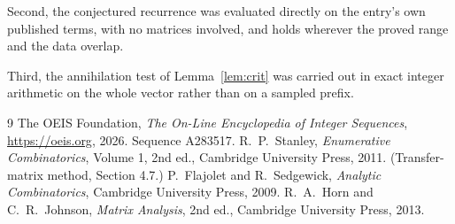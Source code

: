 \documentclass[11pt,a4paper]{article}
\theoremstyle{plain}
\theoremstyle{definition}
\begin{document}
Second, the conjectured recurrence was evaluated directly on the entry's own published terms,
with no matrices involved, and holds wherever the proved range and the data overlap.

Third, the annihilation test of Lemma~\ref{lem:crit} was carried out in exact integer
arithmetic on the whole vector rather than on a sampled prefix.

\begin{thebibliography}{9}
 The OEIS Foundation, \emph{The On-Line Encyclopedia of Integer
Sequences}, \url{https://oeis.org}, 2026. Sequence A283517.
 R.~P.~Stanley, \emph{Enumerative Combinatorics}, Volume 1, 2nd ed.,
Cambridge University Press, 2011. (Transfer-matrix method, Section 4.7.)
 P.~Flajolet and R.~Sedgewick, \emph{Analytic Combinatorics}, Cambridge
University Press, 2009.
 R.~A.~Horn and C.~R.~Johnson, \emph{Matrix Analysis}, 2nd ed., Cambridge
University Press, 2013.
\end{thebibliography}
\end{document}
